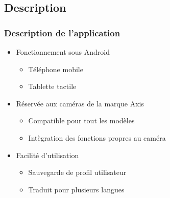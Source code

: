 \documentclass{beamer}
\begin{document}
  \subsection{Description}
  \begin{frame}
   \frametitle{Description de l'application}
   \begin{itemize}
   \item Fonctionnement sous Android
       \begin{itemize}
    	\item Téléphone mobile
   		\item Tablette tactile
    	\end{itemize}
   \item Réservée aux caméras de la marque Axis
   		\begin{itemize}
    	\item Compatible pour tout les modèles
   		\item Intègration des fonctions propres au caméra
    	\end{itemize}
   \item Facilité d'utilisation
   		\begin{itemize}
    	\item Sauvegarde de profil utilisateur
   		\item Traduit pour plusieurs langues
    	\end{itemize}
   \end{itemize}
  \end{frame}
















\end{document}
